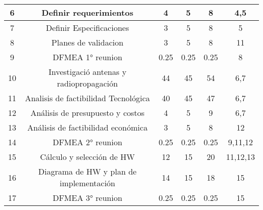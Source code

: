 \begin{table}[H]
\begin{tabular}{|c|c|c|c|c|c|}
6           & Definir requerimientos                  & 4                           & 5                 & 8                           & 4,5                                       \\ \hline
7           & Definir Especificaciones                & 3                           & 5                 & 8                           & 5                                         \\ \hline
8           & Planes de validacion                    & 3                           & 5                 & 8                           & 11                                        \\ \hline
9           & DFMEA 1° reunion                        & 0.25                        & 0.25              & 0.25                        & 8                                         \\ \hline
10          & Investigació antenas y radiopropagación & 44                          & 45                & 54                          & 6,7                                       \\ \hline
11          & Analisis de factibilidad Tecnológica    & 40                          & 45                & 47                          & 6,7                                       \\ \hline
12          & Análisis de presupuesto y costos        & 4                           & 5                 & 9                           & 6,7                                       \\ \hline
13          & Análisis de factibilidad económica      & 3                           & 5                 & 8                           & 12                                        \\ \hline
14          & DFMEA 2° reunion                        & 0.25                        & 0.25              & 0.25                        & 9,11,12                                   \\ \hline
15          & Cálculo y selección de HW               & 12                          & 15                & 20                          & 11,12,13                                  \\ \hline
16          & Diagrama de HW y plan de implementación & 14                          & 15                & 18                          & 15                                        \\ \hline
17          & DFMEA 3° reunion                        & 0.25                        & 0.25              & 0.25                        & 15                                        \\ \hline

\end{tabular}
\end{table}
